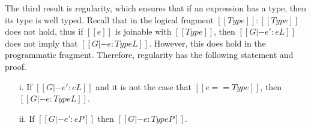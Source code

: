 The third result is regularity, which ensures that if an expression
has a type, then its type is well typed.  Recall that in the logical
fragment $[[Type]] : [[Type]]$ does not hold, thus if $[[e]]$ is
joinable with $[[Type]]$, then $[[G |- e' : e L]]$ does not imply that
$[[G |- e : Type L]]$.  However, this does hold in the programmatic
fragment.  Therefore, regularity has the following statement and
proof.  
\begin{lemma}[Regularity]
  \label{lemma:regularity}
  \begin{itemize}
  \item[i.] If $[[G |- e':e L]]$ and it is not the case that $[[e == Type]]$, then $[[G |- e:Type L]]$.
  \item[ii.] If $[[G |- e':e P]]$ then $[[G |- e:Type P]]$.
  \end{itemize}
\end{lemma}
